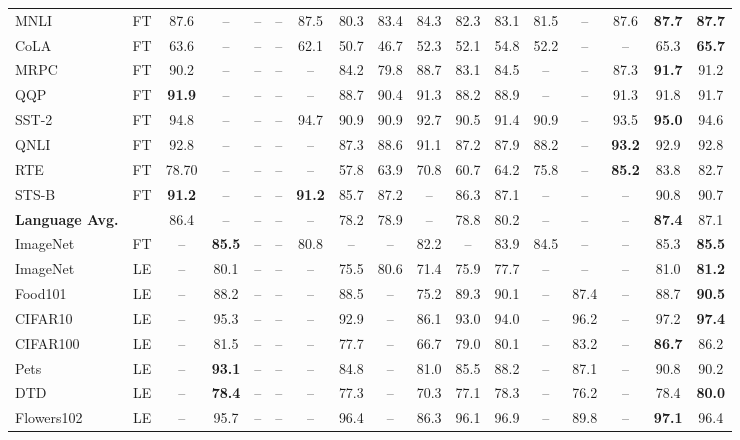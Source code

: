\documentclass[11pt]{article}
\begin{document}
\begin{table*}[t]
{\begin{tabular}{lc|ccccccccccccccc}
\midrule 
MNLI & FT & 87.6 & -- & -- & -- & 87.5 & 80.3 & 83.4 & 84.3 & 82.3 & 83.1 & 81.5 & -- & 87.6 & {\bf 87.7} & {\bf 87.7} \\
CoLA & FT & 63.6 & -- & -- & -- & 62.1 & 50.7 & 46.7 & 52.3 & 52.1 & 54.8 & 52.2 & -- & -- & 65.3 & {\bf 65.7} \\
MRPC & FT & 90.2 & -- & -- & -- & -- & 84.2 & 79.8 & 88.7 & 83.1 & 84.5 & -- & -- & 87.3 & {\bf 91.7} & 91.2 \\
QQP & FT & {\bf 91.9} & -- & -- & -- & -- & 88.7 & 90.4 & 91.3 & 88.2 & 88.9 & -- & -- & 91.3 &  91.8 & 91.7 \\
SST-2 & FT & 94.8 & -- & -- & -- & 94.7 & 90.9 & 90.9 & 92.7 & 90.5 & 91.4 & 90.9 & -- & 93.5 & {\bf 95.0} & 94.6 \\
QNLI & FT & 92.8 & -- & -- & -- & -- & 87.3 & 88.6 & 91.1 & 87.2 & 87.9 & 88.2 & -- & {\bf 93.2} & 92.9 & 92.8 \\
RTE & FT & 78.70 & -- & -- & -- & -- & 57.8 & 63.9 & 70.8 & 60.7 & 64.2 & 75.8 & -- & {\bf 85.2} & 83.8 & 82.7 \\
STS-B & FT & {\bf 91.2} & -- & -- & -- & {\bf 91.2} & 85.7 & 87.2 & -- & 86.3 & 87.1 & -- & -- & -- & 90.8 & 90.7 \\
\midrule 
\textbf{Language Avg.} &  & 86.4 & -- & -- & -- & -- & 78.2 & 78.9 & -- & 78.8 & 80.2 & -- & -- & -- & {\bf 87.4} & 87.1 \\
\midrule 
ImageNet & FT & -- & {\bf 85.5} & -- & -- & 80.8  & -- & -- & 82.2 & -- & 83.9 & 84.5 & -- & -- & 85.3 & {\bf 85.5} \\
ImageNet & LE & -- & 80.1 & -- &  -- & --  & 75.5 & 80.6 & 71.4 & 75.9 & 77.7 & -- & -- & -- & 81.0 & {\bf 81.2} \\
Food101 & LE & -- & 88.2 & -- & -- & -- & 88.5 & -- & 75.2 & 89.3 & 90.1 & -- & 87.4  & -- & 88.7 & {\bf 90.5}  \\
CIFAR10 & LE & -- & 95.3 & -- & -- & -- & 92.9 & -- & 86.1 & 93.0 & 94.0 & -- & 96.2 & -- & 97.2 & {\bf 97.4} \\
CIFAR100 & LE & -- & 81.5 & -- & -- & -- & 77.7 & -- & 66.7 & 79.0 & 80.1 & -- & 83.2 & -- & {\bf 86.7} & 86.2 \\
Pets & LE & -- & {\bf 93.1} & -- & -- & -- & 84.8 & -- & 81.0 & 85.5 & 88.2 & -- & 87.1 & -- & 90.8 & 90.2 \\
DTD & LE & -- & {\bf 78.4} & -- & -- & -- & 77.3 & -- & 70.3 & 77.1 & 78.3 & -- & 76.2 & -- & 78.4 & {\bf 80.0} \\
Flowers102 & LE & -- & 95.7 & -- & -- & -- & 96.4 & -- & 86.3 & 96.1 & 96.9 & -- & 89.8 & -- & {\bf 97.1} & 96.4 \\

\end{tabular}}
\end{table*}
\end{document}
